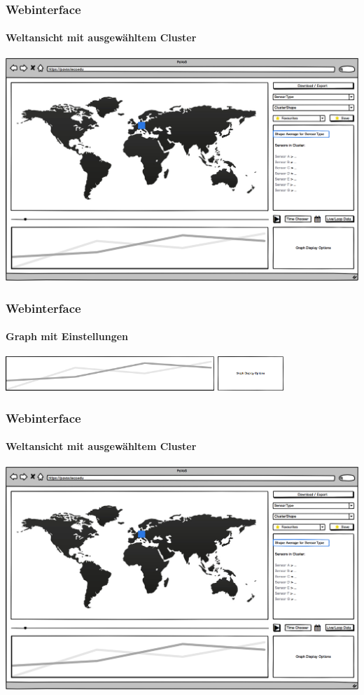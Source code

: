 \documentclass{beamer}
\begin{document}
\begin{frame}
	\frametitle{Webinterface}
	\framesubtitle{Weltansicht mit ausgewähltem Cluster}
	\centering
	\includegraphics[width=\linewidth]{gui/frontend/FrontGUIWorldWithShapeSelection}
\end{frame}

\begin{frame}
	\frametitle{Webinterface}
	\framesubtitle{Graph mit Einstellungen}
	\centering
	\includegraphics[height=1.3cm]{gui/frontend/FrontGUIDetailGraph}
	\includegraphics[height=1.3cm]{gui/frontend/FrontGUIGraphSettings}
\end{frame}

\begin{frame}
	\frametitle{Webinterface}
	\framesubtitle{Weltansicht mit ausgewähltem Cluster}
	\centering
	\includegraphics[width=\linewidth]{gui/frontend/FrontGUIWorldWithShapeSelection}
\end{frame}
\end{document}
